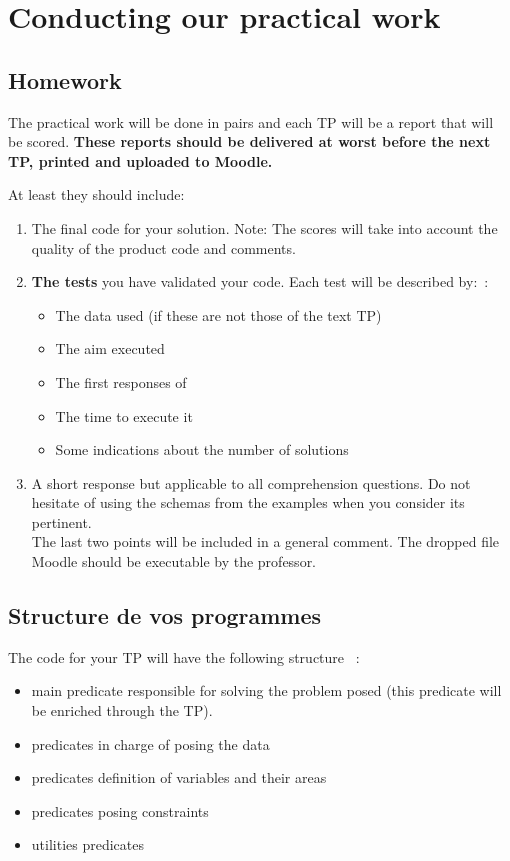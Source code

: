 \chapter*{Conducting our practical work}

\section*{Homework}
The practical work will be done in pairs and each TP will be a report that will be scored. {\bf These reports should be delivered at worst before the next TP, printed  and uploaded to Moodle.}

At least they should include:
\begin{enumerate}
\item The final code for your solution. Note: The scores will take into account the quality of the product code and comments.
 \item {\bf The tests} you have validated your code. Each test will be described by:~:
\begin{itemize}
\item The data used (if these are not those of the text TP)
\item The aim executed
\item The first responses of \eclipse
\item The time to execute it
\item Some indications about the number of solutions
\end{itemize}

\item A short response but applicable to all comprehension questions. Do not hesitate of using the schemas from the examples when you consider its pertinent.\\

The last two points will be included in a general comment. The dropped file Moodle should be executable by the professor.
\end{enumerate}
 
\section*{Structure de vos programmes}
The code for your TP will have the following structure ~:
\begin{itemize}
 \item main predicate responsible for solving the problem posed (this predicate will be enriched through the TP).
 \item predicates in charge of posing the data
 \item predicates definition of variables and their areas
 \item predicates posing constraints
 \item utilities predicates
\end{itemize}

